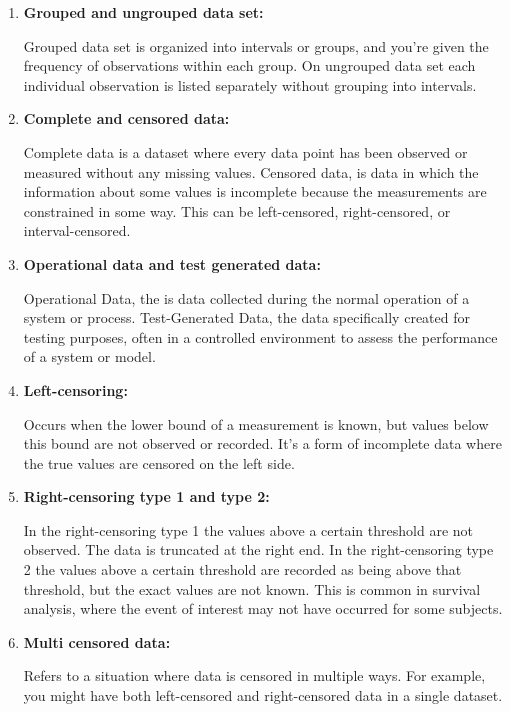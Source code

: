 \documentclass{article}
\begin{document}
\begin{enumerate}[label=(\alph*)]
    \item \textbf{Grouped and ungrouped data set:} 
    
        Grouped data set is organized into intervals or groups, and you're given the frequency of observations within each group. On ungrouped data set each individual observation is listed separately without grouping into intervals.
           
    \item \textbf{Complete and censored data:}
    
        Complete data is a dataset where every data point has been observed or measured without any missing values.
        Censored data, is data in which the information about some values is incomplete because the measurements are constrained in some way. This can be left-censored, right-censored, or interval-censored.
        
    \item \textbf{Operational data and test generated data:}
    
        Operational Data, the is data collected during the normal operation of a system or process.
        Test-Generated Data, the data specifically created for testing purposes, often in a controlled environment to assess the performance of a system or model.
    \item \textbf{Left-censoring:}
    
        Occurs when the lower bound of a measurement is known, but values below this bound are not observed or recorded. It's a form of incomplete data where the true values are censored on the left side.
        
    \item \textbf{Right-censoring type 1 and type 2:}
    
       In the right-censoring type 1 the values above a certain threshold are not observed. The data is truncated at the right end.
       In the right-censoring type 2 the values above a certain threshold are recorded as being above that threshold, but the exact values are not known. This is common in survival analysis, where the event of interest may not have occurred for some subjects.
        
    \item \textbf{Multi censored data:}
    
        Refers to a situation where data is censored in multiple ways. For example, you might have both left-censored and right-censored data in a single dataset.
\end{enumerate}
\end{document}
